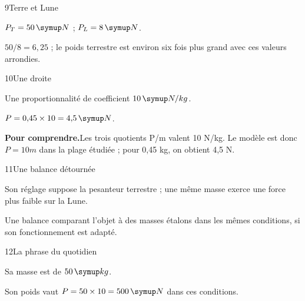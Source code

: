 \par\noindent\begin{minipage}{\linewidth}
\begin{corrige}{9}{Terre et Lune}
\begin{questions}
\item $P_T=50\unite N$ ; $P_L=8\unite N$.
\item $50/8=6{,}25$ ; le poids terrestre est environ six fois plus grand avec ces valeurs arrondies.
\end{questions}
\end{corrige}
\end{minipage}
\par\noindent\begin{minipage}{\linewidth}
\begin{corrige}{10}{Une droite}
\begin{questions}
\item Une proportionnalité de coefficient $10\unite{N/kg}$.
\item $P=0{,}45\times10=4{,}5\unite N$.
\end{questions}
\par\smallskip\noindent\textbf{Pour comprendre.}\enspace Les trois quotients P/m valent 10 N/kg. Le modèle est donc $P=10m$ dans la plage étudiée ; pour 0,45 kg, on obtient 4,5 N.\par
{}
\end{corrige}
\end{minipage}
\par\noindent\begin{minipage}{\linewidth}
\begin{corrige}{11}{Une balance détournée}
\begin{questions}
\item Son réglage suppose la pesanteur terrestre ; une même masse exerce une force plus faible sur la Lune.
\item Une balance comparant l’objet à des masses étalons dans les mêmes conditions, si son fonctionnement est adapté.
\end{questions}
\end{corrige}
\end{minipage}
\par\noindent\begin{minipage}{\linewidth}
\begin{corrige}{12}{La phrase du quotidien}
\begin{questions}
\item Sa masse est de $50\unite{kg}$.
\item Son poids vaut $P=50\times10=500\unite N$ dans ces conditions.
\end{questions}
\end{corrige}
\end{minipage}
